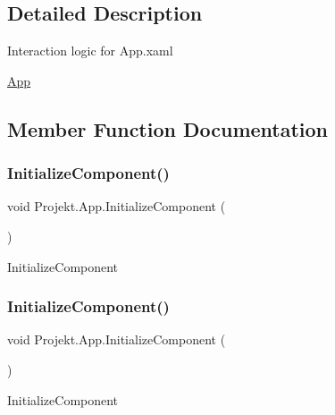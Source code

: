 \subsection{Detailed Description}
Interaction logic for App.\+xaml 

\mbox{\hyperlink{class_projekt_1_1_app}{App}}

\subsection{Member Function Documentation}
\mbox{\label{class_projekt_1_1_app_a635d2eb65d8980fdf881a2b5ce6213f8}} 
\subsubsection{\texorpdfstring{InitializeComponent()}{InitializeComponent()}\hspace{0.1cm}{\footnotesize\ttfamily [1/2]}}
{\footnotesize\ttfamily void Projekt.\+App.\+Initialize\+Component (\begin{DoxyParamCaption}{ }\end{DoxyParamCaption})}



Initialize\+Component 

\mbox{\label{class_projekt_1_1_app_a635d2eb65d8980fdf881a2b5ce6213f8}} 
\subsubsection{\texorpdfstring{InitializeComponent()}{InitializeComponent()}\hspace{0.1cm}{\footnotesize\ttfamily [2/2]}}
{\footnotesize\ttfamily void Projekt.\+App.\+Initialize\+Component (\begin{DoxyParamCaption}{ }\end{DoxyParamCaption})}



Initialize\+Component 

\mbox{\label{class_projekt_1_1_app_a35398757aacd40ab369960c883a72b5e}} 
